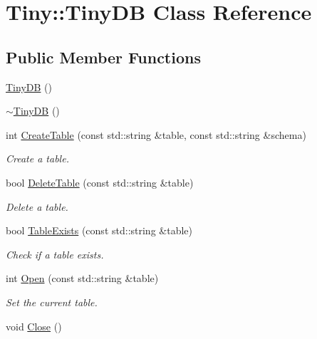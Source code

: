 \hypertarget{classTiny_1_1TinyDB}{\section{Tiny\-:\-:Tiny\-D\-B Class Reference}
\label{classTiny_1_1TinyDB}
}
\subsection*{Public Member Functions}
\begin{DoxyCompactItemize}
\item 
\hyperlink{classTiny_1_1TinyDB_a7065ccda0731928b4b24c6aa9810f551}{Tiny\-D\-B} ()
\item 
\hyperlink{classTiny_1_1TinyDB_a0375fa0b3e3eac3be070a03057637a12}{$\sim$\-Tiny\-D\-B} ()
\item 
int \hyperlink{classTiny_1_1TinyDB_ae432d4e6032a3f3395c51458de344ac6}{Create\-Table} (const std\-::string \&table, const std\-::string \&schema)
\begin{DoxyCompactList}\small\item\em Create a table. \end{DoxyCompactList}\item 
bool \hyperlink{classTiny_1_1TinyDB_ac5990fe5e1bc8e7fe4103bb7e435618a}{Delete\-Table} (const std\-::string \&table)
\begin{DoxyCompactList}\small\item\em Delete a table. \end{DoxyCompactList}\item 
bool \hyperlink{classTiny_1_1TinyDB_ad82d10c88df3c3318708518ce4571e5d}{Table\-Exists} (const std\-::string \&table)
\begin{DoxyCompactList}\small\item\em Check if a table exists. \end{DoxyCompactList}\item 
int \hyperlink{classTiny_1_1TinyDB_ac65bbcea4f2ffb104987aa703c49d1bc}{Open} (const std\-::string \&table)
\begin{DoxyCompactList}\small\item\em Set the current table. \end{DoxyCompactList}\item 
\hypertarget{classTiny_1_1TinyDB_a677ece6b542a1ffb980e900deb6723a1}{void \hyperlink{classTiny_1_1TinyDB_a677ece6b542a1ffb980e900deb6723a1}{Close} ()}\label{classTiny_1_1TinyDB_a677ece6b542a1ffb980e900deb6723a1}


\end{DoxyCompactItemize}
